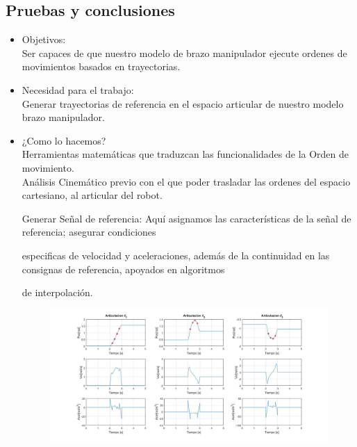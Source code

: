 \subsection{Pruebas y conclusiones}

\begin{itemize}

\item Objetivos: \\

Ser capaces de que nuestro modelo de brazo manipulador ejecute ordenes de movimientos basados en trayectorias.\\



\item Necesidad para el trabajo: \\

Generar trayectorias de referencia en el espacio articular de nuestro modelo brazo manipulador.\\



\item ¿Como lo hacemos? \\ 

Herramientas matemáticas que traduzcan las funcionalidades de la Orden de movimiento. \\ 

Análisis Cinemático previo con el que poder trasladar las ordenes del espacio cartesiano, al articular del robot.

Generar Señal de referencia: Aquí asignamos las características de la señal de referencia; asegurar condiciones 

especificas de velocidad y aceleraciones, además de la continuidad en las consignas de referencia, apoyados en algoritmos

de interpolación. \\ 



\begin{figure}[h!]
	
	\centering
	
	\includegraphics[width=1\textwidth]{GeneradorTrayLineal}
	

\end{figure}
\end{itemize}
